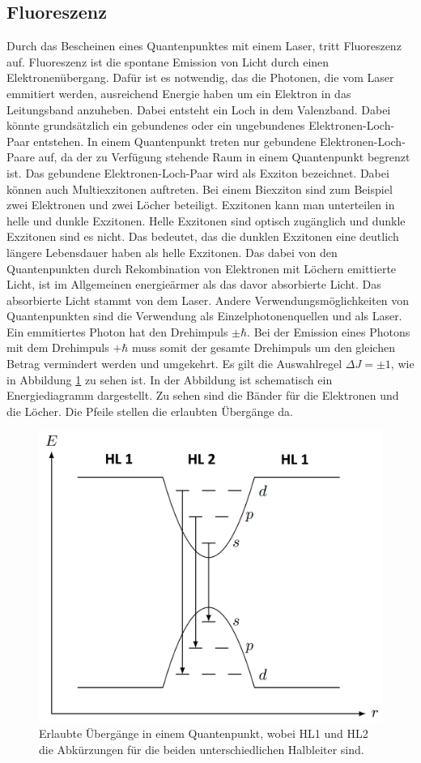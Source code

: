 \subsection{Fluoreszenz}
Durch das Bescheinen eines Quantenpunktes mit einem Laser, tritt Fluoreszenz auf. Fluoreszenz ist die spontane Emission von Licht durch einen Elektronenübergang. Dafür ist es notwendig, das die Photonen, die vom Laser emmitiert werden, ausreichend  Energie haben um ein Elektron in das Leitungsband anzuheben. Dabei entsteht ein Loch in dem Valenzband. Dabei könnte grundsätzlich  ein gebundenes oder ein ungebundenes Elektronen-Loch-Paar entstehen. 
In einem Quantenpunkt treten nur gebundene Elektronen-Loch-Paare auf, da der zu Verfügung stehende  Raum in einem Quantenpunkt begrenzt ist.
 Das gebundene Elektronen-Loch-Paar wird als Exziton bezeichnet. Dabei können auch Multiexzitonen auftreten. Bei einem Biexziton sind zum Beispiel zwei Elektronen und zwei Löcher beteiligt. 
 Exzitonen kann man unterteilen in helle und dunkle Exzitonen. 
 Helle Exzitonen  sind optisch zugänglich und dunkle Exzitonen sind es nicht. 
 Das bedeutet, das die dunklen Exzitonen eine deutlich längere Lebensdauer haben als helle Exzitonen. 
 Das dabei von den Quantenpunkten durch Rekombination von Elektronen mit Löchern emittierte Licht, ist im Allgemeinen energieärmer als das davor absorbierte Licht. Das absorbierte Licht stammt von dem Laser. 
 Andere Verwendungsmöglichkeiten von  Quantenpunkten sind die Verwendung als Einzelphotonenquellen und als Laser.
 Ein emmitiertes Photon hat den Drehimpuls $\pm \hbar$. Bei der Emission eines Photons  mit dem Drehimpuls $+ \hbar$ muss somit der gesamte Drehimpuls um den gleichen Betrag vermindert werden und umgekehrt. Es gilt die Auswahlregel $ \Delta J = \pm 1$, wie in Abbildung \ref{fig:QP_Energien} zu sehen ist. 
 In der Abbildung ist schematisch ein Energiediagramm dargestellt. Zu sehen sind die Bänder für die Elektronen und die Löcher. Die Pfeile stellen die erlaubten Übergänge da. 
 \begin{figure}[H]
\centering
\includegraphics[scale=0.3]{QP_Energie.PNG}
\caption{Erlaubte Übergänge in einem Quantenpunkt, wobei HL1 und HL2 die Abkürzungen für die beiden unterschiedlichen Halbleiter sind.}
\label{fig:QP_Energien}
\end{figure}
